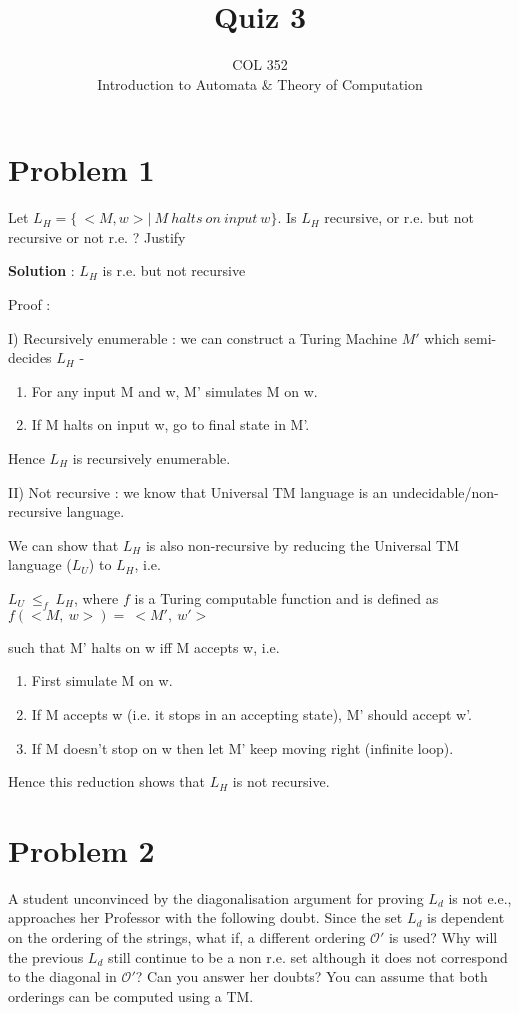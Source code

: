 \documentclass{article}
\title{Quiz 3}
\author{COL 352\\
    Introduction to Automata \& 
    Theory of Computation}
\date{}
\begin{document}
    \maketitle
    
    \section*{Problem 1} Let $L_H = \{~<M,w>|\ M\ halts\ on\ input\ w \}$. Is $L_H$ recursive, or r.e. but not recursive or not r.e. ? Justify

    \textbf{Solution} : $L_H$ is r.e. but not recursive
    
    Proof :
    
    I) Recursively enumerable : we can construct a Turing Machine $M'$ which semi-decides $L_H$ -
    \begin{enumerate}[topsep=0pt]
    \item  For any input M and w, M' simulates M on w.
    \item  If M halts on input w, go to final state in M'.
    \end{enumerate}
    Hence $L_H$ is recursively enumerable.
    
    II) Not recursive : we know that Universal TM language is an undecidable/non-recursive language.
    
    \quad We can show that $L_H$ is also non-recursive by reducing the Universal TM language ($L_U$) to $L_H$, i.e.
    
    \quad $L_U\ {\le }_f\ L_H$, where $f$ is a Turing computable function and is defined as $f(<M,~w>)=\ <M',~w'>$ 
    
    \quad such that M' halts on w iff M accepts w, i.e.
    \begin{enumerate}[leftmargin=3em, topsep=0pt]
    \item  First simulate M on w.
    \item  If M accepts w (i.e. it stops in an accepting state), M' should accept w'.
    \item  If M doesn't stop on w then let M' keep moving right (infinite loop). 
    \end{enumerate}
    Hence this reduction shows that $L_H$ is not recursive.
    
    
    \section*{Problem 2} A student unconvinced by the diagonalisation argument for proving $L_d$ is not e.e., approaches her Professor with the following doubt. Since the set $L_d$ is dependent on the ordering of the strings, what if, a different ordering $\mathcal{O}'$ is used? Why will the previous $L_d$ still continue to be a non r.e. set although it does not correspond to the diagonal in $\mathcal{O}'$? Can you answer her doubts? You can assume that both orderings can be computed using a TM.
    
\end{document}

